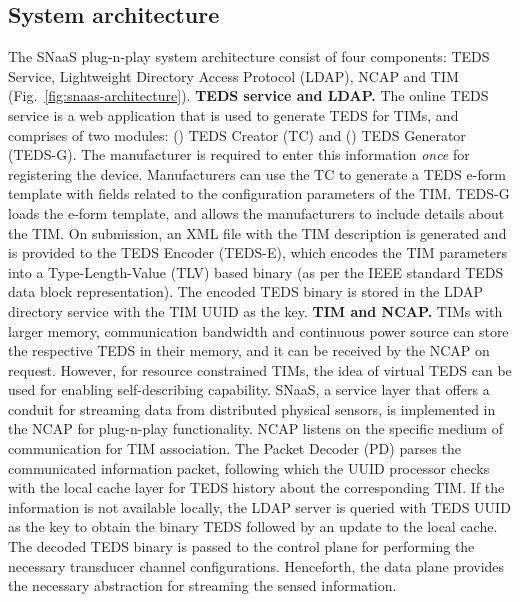 \documentclass[conference]{IEEEtran}
\begin{document}
\subsection{System architecture}

The SNaaS plug-n-play system architecture consist of four components: TEDS Service, Lightweight Directory Access Protocol (LDAP), NCAP and TIM (Fig.~\ref{fig:snaas-architecture}).
\vspace{1mm}
\newline
\noindent
 \textbf{TEDS service and LDAP.}
The online TEDS service is a web application that is used to generate TEDS for TIMs, and comprises of two modules: () TEDS Creator (TC) and () TEDS Generator (TEDS-G).
The manufacturer is required to enter this information \emph{once} for registering the device.
\newline
\indent
Manufacturers can use the TC to generate a TEDS e-form template with fields related to the configuration parameters of the TIM. TEDS-G loads the e-form template, and allows the manufacturers to include details about the TIM.
On submission, an XML file with the TIM description is generated and is provided to the TEDS Encoder (TEDS-E), which encodes the TIM parameters into a Type-Length-Value (TLV) based binary (as per the IEEE  standard TEDS data block representation).
The encoded TEDS binary is stored in the LDAP directory service with the TIM UUID as the key.
\vspace{1mm}
\newline
\noindent
 \textbf{TIM and NCAP.}
TIMs with larger memory, communication bandwidth and continuous power source can store the respective TEDS in their memory, and it can be received by the NCAP on request. 
However, for resource constrained TIMs, the idea of virtual TEDS can be used for enabling self-describing capability. 
\newline
\indent
SNaaS, a service layer that offers a conduit for streaming data from distributed physical sensors, is implemented in the NCAP for plug-n-play functionality.  
NCAP listens on the specific medium of communication for TIM association.
The Packet Decoder (PD) parses the communicated information packet, following which the UUID processor checks with the local cache layer for TEDS history about the corresponding TIM.
If the information is not available locally, the LDAP server is queried with TEDS UUID as the key to obtain the binary TEDS followed by an update to the local cache. 
The decoded TEDS binary is passed to the control plane for performing the necessary transducer channel configurations.
Henceforth, the data plane provides the necessary abstraction for streaming the sensed information. 
\end{document}
